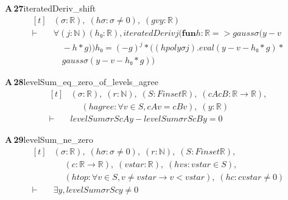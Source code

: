 \documentclass[conference]{IEEEtran}
\theoremstyle{definition}
\newcommand{\lean}[1]{\textsf{\footnotesize #1}}
\begin{document}
\noindent\textbf{A\,27}\quad\lean{iteratedDeriv\_shift}
{\footnotesize\[ \begin{aligned}[t]
&(\sigma : \mathbb{R} ),\; (\mathit{hσ} : \sigma \neq 0),\; (\mathit{g} \mathit{v} \mathit{y} : \mathbb{R} )\\
\vdash\;&\forall (\mathit{j} : \mathbb{N} ) (\mathit{h₀} : \mathbb{R} ), \mathit{iteratedDeriv} \mathit{j} (\mathbf{fun} \mathit{h} : \mathbb{R} => \mathit{gauss} \sigma (\mathit{y} - \mathit{v}\\
&\quad - \mathit{h} * \mathit{g})) \mathit{h₀} = (-\mathit{g}) ^{\mathit{j}} * ((\mathit{hpoly} \sigma \mathit{j}).\mathit{eval} (\mathit{y} - \mathit{v} - \mathit{h₀} * \mathit{g}) *\\
&\quad \mathit{gauss} \sigma (\mathit{y} - \mathit{v} - \mathit{h₀} * \mathit{g}))
\end{aligned} \]}

\noindent\textbf{A\,28}\quad\lean{levelSum\_eq\_zero\_of\_levels\_agree}
{\footnotesize\[ \begin{aligned}[t]
&(\sigma : \mathbb{R} ),\; (\mathit{r} : \mathbb{N} ),\; (\mathit{S} : \mathit{Finset} \mathbb{R} ),\; (\mathit{cA} \mathit{cB} : \mathbb{R} \to \mathbb{R} ),\\
&\quad \; (\mathit{hagree} : \forall \mathit{v} \in \mathit{S}, \mathit{cA} \mathit{v} = \mathit{cB} \mathit{v}),\; (\mathit{y} : \mathbb{R} )\\
\vdash\;&\mathit{levelSum} \sigma \mathit{r} \mathit{S} \mathit{cA} \mathit{y} - \mathit{levelSum} \sigma \mathit{r} \mathit{S} \mathit{cB} \mathit{y} = 0
\end{aligned} \]}

\noindent\textbf{A\,29}\quad\lean{levelSum\_ne\_zero}
{\footnotesize\[ \begin{aligned}[t]
&(\sigma : \mathbb{R} ),\; (\mathit{hσ} : \sigma \neq 0),\; (\mathit{r} : \mathbb{N} ),\; (\mathit{S} : \mathit{Finset} \mathbb{R} ),\\
&\quad \; (\mathit{c} : \mathbb{R} \to \mathbb{R} ),\; (\mathit{vstar} : \mathbb{R} ),\; (\mathit{hvs} : \mathit{vstar} \in \mathit{S}),\\
&\quad \; (\mathit{htop} : \forall \mathit{v} \in \mathit{S}, \mathit{v} \neq \mathit{vstar} \to \mathit{v} < \mathit{vstar}),\; (\mathit{hc} : \mathit{c} \mathit{vstar} \neq 0)\\
\vdash\;&\exists \mathit{y}, \mathit{levelSum} \sigma \mathit{r} \mathit{S} \mathit{c} \mathit{y} \neq 0
\end{aligned} \]}
\end{document}
